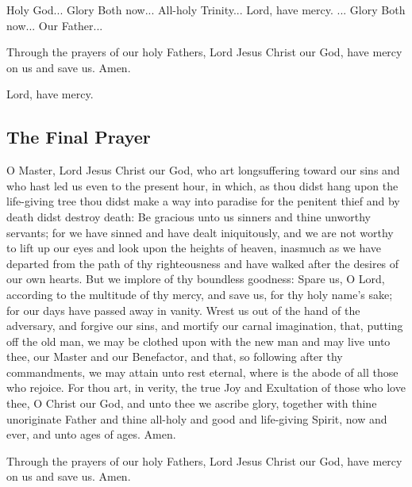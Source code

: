 Holy God... Glory  Both now... All-holy Trinity... Lord, have mercy. ... Glory  Both now... Our Father...

Through the prayers of our holy Fathers, Lord Jesus Christ our God, have mercy on us and save us. Amen.

Lord, have mercy. 

\subsection{The Final Prayer}

O Master, Lord Jesus Christ our God, who art longsuffering toward our sins and who hast led us even to the present hour, in which, as thou didst hang upon the life-giving tree thou didst make a way into paradise for the penitent thief and by death didst destroy death: Be gracious unto us sinners and thine unworthy servants; for we have sinned and have dealt iniquitously, and we are not worthy to lift up our eyes and look upon the heights of heaven, inasmuch as we have departed from the path of thy righteousness and have walked after the desires of our own hearts. But we implore of thy boundless goodness: Spare us, O Lord, according to the multitude of thy mercy, and save us, for thy holy name's sake; for our days have passed away in vanity. Wrest us out of the hand of the adversary, and forgive our sins, and mortify our carnal imagination, that, putting off the old man, we may be clothed upon with the new man and may live unto thee, our Master and our Benefactor, and that, so following after thy commandments, we may attain unto rest eternal, where is the abode of all those who rejoice. For thou art, in verity, the true Joy and Exultation of those who love thee, O Christ our God, and unto thee we ascribe glory, together with thine unoriginate Father and thine all-holy and good and life-giving Spirit, now and ever, and unto ages of ages. Amen.

Through the prayers of our holy Fathers, Lord Jesus Christ our God, have mercy on us and save us. Amen.

\cleardoublepage
